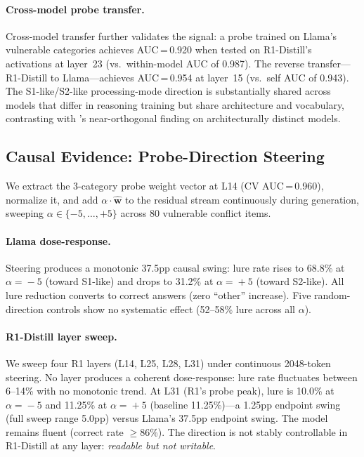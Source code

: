 \documentclass[twocolumn,10pt]{article}
\newcommand{\sone}{S1-like}
\newcommand{\stwo}{S2-like}
\begin{document}
\paragraph{Cross-model probe transfer.}
Cross-model transfer further validates the signal: a probe trained on
Llama's vulnerable categories achieves AUC\,=\,0.920 when tested on
R1-Distill's activations at layer~23 (vs.\ within-model AUC of 0.987).
The reverse transfer---R1-Distill to Llama---achieves AUC\,=\,0.954 at
layer~15 (vs.\ self AUC of 0.943).  The \sone{}/\stwo{} processing-mode
direction is substantially shared across models that differ in reasoning
training but share architecture and vocabulary, contrasting with
\citet{huang2026cogbias}'s near-orthogonal finding on architecturally
distinct models.

\subsection{Causal Evidence: Probe-Direction Steering}
\label{sec:results_steering}

We extract the 3-category probe weight vector at L14 (CV AUC\,=\,0.960),
normalize it, and add $\alpha \cdot \hat{\mathbf{w}}$ to the residual
stream continuously during generation, sweeping $\alpha \in \{-5, \ldots, +5\}$
across 80 vulnerable conflict items.

\paragraph{Llama dose-response.}
Steering produces a monotonic 37.5pp causal swing: lure rate rises to
68.8\% at $\alpha\!=\!-5$ (toward \sone{}) and drops to 31.2\% at
$\alpha\!=\!+5$ (toward \stwo{}).  All lure reduction converts to
correct answers (zero ``other'' increase).  Five random-direction controls
show no systematic effect (52--58\% lure across all $\alpha$).

\paragraph{R1-Distill layer sweep.}
We sweep four R1 layers (L14, L25, L28, L31) under continuous
2048-token steering.  No layer produces a coherent dose-response:
lure rate fluctuates between 6--14\% with no monotonic trend.  At
L31 (R1's probe peak), lure is 10.0\% at $\alpha\!=\!-5$ and 11.25\%
at $\alpha\!=\!+5$ (baseline 11.25\%)---a 1.25pp endpoint swing (full
sweep range 5.0pp) versus Llama's 37.5pp endpoint swing.  The model remains fluent (correct rate $\geq$86\%).
The direction is not stably controllable in R1-Distill at any layer:
\emph{readable but not writable}.
\end{document}

